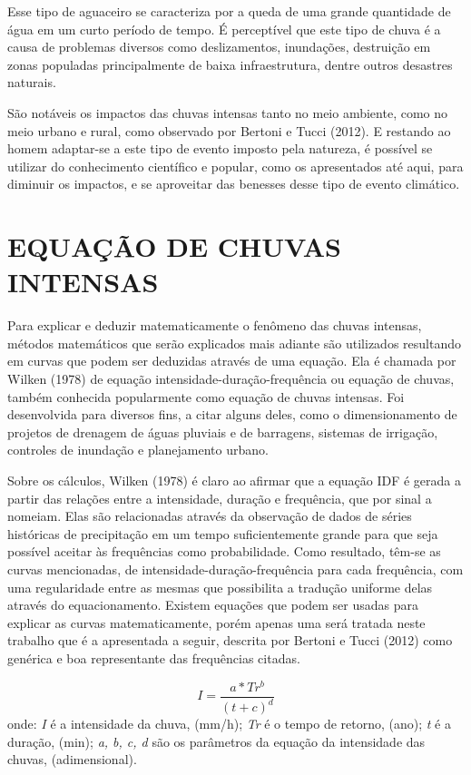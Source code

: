 Esse tipo de aguaceiro se caracteriza por a queda de uma grande quantidade de água em um curto período de tempo. É perceptível que este tipo de chuva é a causa de problemas diversos como deslizamentos, inundações, destruição em zonas populadas principalmente de baixa infraestrutura, dentre outros desastres naturais.

São notáveis os impactos das chuvas intensas tanto no meio ambiente, como no meio urbano e rural, como observado por Bertoni e Tucci (2012). E restando ao homem adaptar-se a este tipo de evento imposto pela natureza, é possível se utilizar do conhecimento científico e popular, como os apresentados até aqui, para diminuir os impactos, e se aproveitar das benesses desse tipo de evento climático.

\section{EQUAÇÃO DE CHUVAS INTENSAS}

Para explicar e deduzir matematicamente o fenômeno das chuvas intensas, métodos matemáticos que serão explicados mais adiante são utilizados resultando em curvas que podem ser deduzidas através de uma equação. Ela é chamada por Wilken (1978) de equação intensidade-duração-frequência ou equação de chuvas, também conhecida popularmente como equação de chuvas intensas. Foi desenvolvida para diversos fins, a citar alguns deles, como o dimensionamento de projetos de drenagem de águas pluviais e de barragens, sistemas de irrigação, controles de inundação e planejamento urbano. 

Sobre os cálculos, Wilken (1978) é claro ao afirmar que a equação IDF é gerada a partir das relações entre a intensidade, duração e frequência, que por sinal a nomeiam. Elas são relacionadas através da observação de dados de séries históricas de precipitação em um tempo suficientemente grande para que seja possível aceitar às frequências como probabilidade.  Como resultado, têm-se as curvas mencionadas, de intensidade-duração-frequência para cada frequência, com uma regularidade entre as mesmas que possibilita a tradução uniforme delas através do equacionamento. Existem equações que podem ser usadas para explicar as curvas matematicamente, porém apenas uma será tratada neste trabalho que é a apresentada a seguir, descrita por Bertoni e Tucci (2012) como genérica e boa representante das frequências citadas.\bigskip

\newpage

\begin{equation}
I = \frac{a * Tr^b}{(t + c)^d}
\end{equation}
\newline
onde:
\newline
\textit{I} é a intensidade da chuva, (mm/h);
\newline
\textit{Tr} é o tempo de retorno, (ano);
\newline
\textit{t} é a duração, (min);
\newline
\textit{a, b, c, d}  são os parâmetros da equação da intensidade das chuvas, (adimensional).\bigskip

